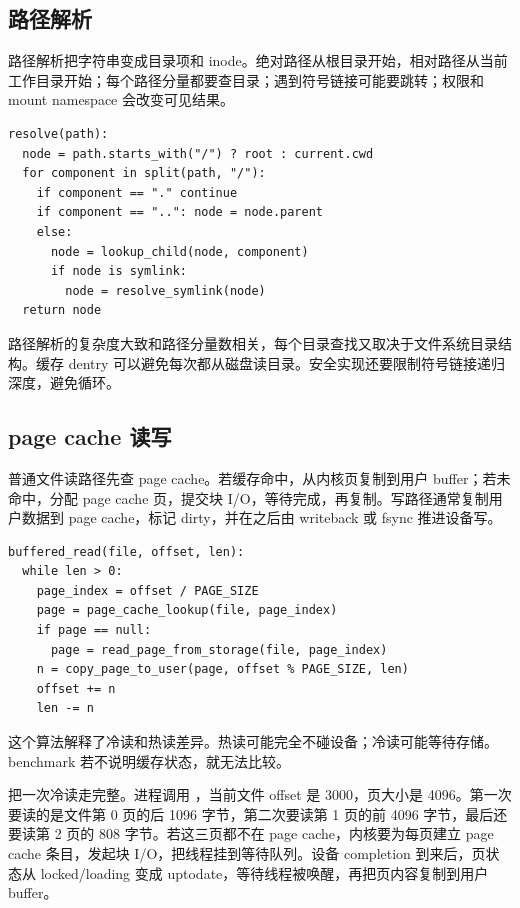 \subsection{路径解析}

路径解析把字符串变成目录项和 inode。绝对路径从根目录开始，相对路径从当前工作目录开始；每个路径分量都要查目录；遇到符号链接可能要跳转；权限和 mount namespace 会改变可见结果。

\begin{lstlisting}
resolve(path):
  node = path.starts_with("/") ? root : current.cwd
  for component in split(path, "/"):
    if component == "." continue
    if component == "..": node = node.parent
    else:
      node = lookup_child(node, component)
      if node is symlink:
        node = resolve_symlink(node)
  return node
\end{lstlisting}

路径解析的复杂度大致和路径分量数相关，每个目录查找又取决于文件系统目录结构。缓存 dentry 可以避免每次都从磁盘读目录。安全实现还要限制符号链接递归深度，避免循环。

\subsection{page cache 读写}

普通文件读路径先查 page cache。若缓存命中，从内核页复制到用户 buffer；若未命中，分配 page cache 页，提交块 I/O，等待完成，再复制。写路径通常复制用户数据到 page cache，标记 dirty，并在之后由 writeback 或 fsync 推进设备写。

\begin{lstlisting}
buffered_read(file, offset, len):
  while len > 0:
    page_index = offset / PAGE_SIZE
    page = page_cache_lookup(file, page_index)
    if page == null:
      page = read_page_from_storage(file, page_index)
    n = copy_page_to_user(page, offset % PAGE_SIZE, len)
    offset += n
    len -= n
\end{lstlisting}

这个算法解释了冷读和热读差异。热读可能完全不碰设备；冷读可能等待存储。benchmark 若不说明缓存状态，就无法比较。

把一次冷读走完整。进程调用 ，当前文件 offset 是 3000，页大小是 4096。第一次要读的是文件第 0 页的后 1096 字节，第二次要读第 1 页的前 4096 字节，最后还要读第 2 页的 808 字节。若这三页都不在 page cache，内核要为每页建立 page cache 条目，发起块 I/O，把线程挂到等待队列。设备 completion 到来后，页状态从 locked/loading 变成 uptodate，等待线程被唤醒，再把页内容复制到用户 buffer。

